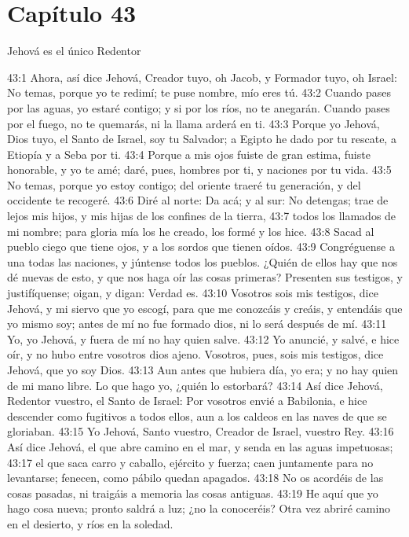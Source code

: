 \section*{Capítulo 43 }
Jehová es el único Redentor 

43:1 Ahora, así dice Jehová, Creador tuyo, oh Jacob, y Formador tuyo, oh Israel: No temas, porque yo te redimí; te puse nombre, mío eres tú. 
43:2 Cuando pases por las aguas, yo estaré contigo; y si por los ríos, no te anegarán. Cuando pases por el fuego, no te quemarás, ni la llama arderá en ti. 
43:3 Porque yo Jehová, Dios tuyo, el Santo de Israel, soy tu Salvador; a Egipto he dado por tu rescate, a Etiopía y a Seba por ti. 
43:4 Porque a mis ojos fuiste de gran estima, fuiste honorable, y yo te amé; daré, pues, hombres por ti, y naciones por tu vida. 
43:5 No temas, porque yo estoy contigo; del oriente traeré tu generación, y del occidente te recogeré. 
43:6 Diré al norte: Da acá; y al sur: No detengas; trae de lejos mis hijos, y mis hijas de los confines de la tierra, 
43:7 todos los llamados de mi nombre; para gloria mía los he creado, los formé y los hice. 
43:8 Sacad al pueblo ciego que tiene ojos, y a los sordos que tienen oídos. 
43:9 Congréguense a una todas las naciones, y júntense todos los pueblos. ¿Quién de ellos hay que nos dé nuevas de esto, y que nos haga oír las cosas primeras? Presenten sus testigos, y justifíquense; oigan, y digan: Verdad es. 
43:10 Vosotros sois mis testigos, dice Jehová, y mi siervo que yo escogí, para que me conozcáis y creáis, y entendáis que yo mismo soy; antes de mí no fue formado dios, ni lo será después de mí. 
43:11 Yo, yo Jehová, y fuera de mí no hay quien salve. 
43:12 Yo anuncié, y salvé, e hice oír, y no hubo entre vosotros dios ajeno. Vosotros, pues, sois mis testigos, dice Jehová, que yo soy Dios. 
43:13 Aun antes que hubiera día, yo era; y no hay quien de mi mano libre. Lo que hago yo, ¿quién lo estorbará? 
43:14 Así dice Jehová, Redentor vuestro, el Santo de Israel: Por vosotros envié a Babilonia, e hice descender como fugitivos a todos ellos, aun a los caldeos en las naves de que se gloriaban. 
43:15 Yo Jehová, Santo vuestro, Creador de Israel, vuestro Rey. 
43:16 Así dice Jehová, el que abre camino en el mar, y senda en las aguas impetuosas; 
43:17 el que saca carro y caballo, ejército y fuerza; caen juntamente para no levantarse; fenecen, como pábilo quedan apagados. 
43:18 No os acordéis de las cosas pasadas, ni traigáis a memoria las cosas antiguas. 
43:19 He aquí que yo hago cosa nueva; pronto saldrá a luz; ¿no la conoceréis? Otra vez abriré camino en el desierto, y ríos en la soledad. 
